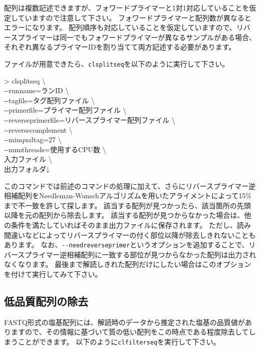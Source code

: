 \documentclass[titlepage,10pt,a4paper]{jsbook}
\newenvironment{cmd}{\begin{oframed}\raggedright\ttfamily\footnotesize\setlength{\baselineskip}{1.4em}}{\end{oframed}\vspace{-1em}}
\begin{document}
配列は複数記述できますが、フォワードプライマーと1対1対応していることを仮定していますので注意して下さい。
フォワードプライマーと配列数が異なるとエラーになります。
配列順序も対応していることを仮定していますので、リバースプライマーは同一でもフォワードプライマーが異なるサンプルがある場合、それぞれ異なるプライマーIDを割り当てて両方記述する必要があります。

ファイルが用意できたら、\texttt{clsplitseq}を以下のように実行して下さい。

\begin{cmd}
{\textgreater} clsplitseq {\textbackslash}\\
{-}{-}runname=ランID {\textbackslash}\\
{-}{-}tagfile=タグ配列ファイル {\textbackslash}\\
{-}{-}primerfile=プライマー配列ファイル {\textbackslash}\\
{-}{-}reverseprimerfile=リバースプライマー配列ファイル {\textbackslash}\\
{-}{-}reversecomplement {\textbackslash}\\
{-}{-}minqualtag=27 {\textbackslash}\\
{-}{-}numthreads=使用するCPU数 {\textbackslash}\\
入力ファイル {\textbackslash}\\
出力フォルダ↓
\end{cmd}

このコマンドでは前述のコマンドの処理に加えて、さらにリバースプライマー逆相補配列をNeedleman-Wunschアルゴリズムを用いたアライメントによって15\%まで不一致を許して探します。
該当する配列が見つかったら、該当箇所の先頭以降を元の配列から除去します。
該当する配列が見つからなかった場合は、他の条件を満たしていればそのまま出力ファイルに保存されます。
ただし、読み間違いなどによってリバースプライマーの付く部位以降が除去しきれないこともあります。
なお、\texttt{{-}{-}needreverseprimer}というオプションを追加することで、リバースプライマー逆相補配列に一致する部位が見つからなかった配列は出力されなくなります。
最後まで解読しきれた配列だけにしたい場合はこのオプションを付けて実行してみて下さい。

\subsection{低品質配列の除去}\label{subsection:qualityfilteringfor454}

FASTQ形式の塩基配列には、解読時のデータから推定された塩基の品質値がありますので、その情報に基づいて質の低い配列をこの時点である程度除去してしまうことができます。
以下のように\texttt{clfilterseq}を実行して下さい。
\end{document}

